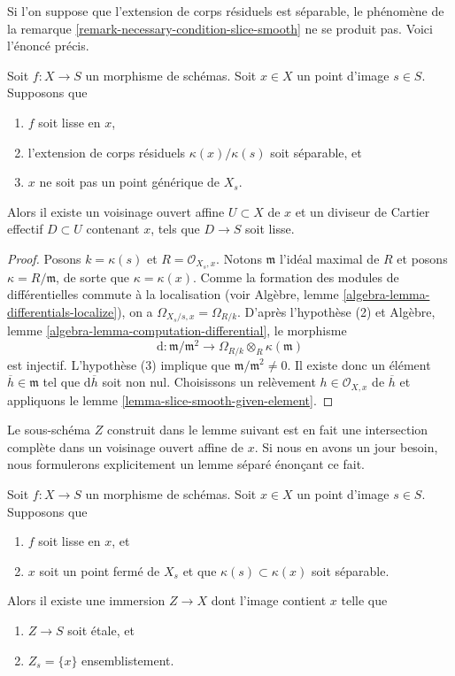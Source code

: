 \noindent
Si l'on suppose que l'extension de corps résiduels est séparable, le
phénomène de la
remarque \ref{remark-necessary-condition-slice-smooth}
ne se produit pas. Voici l'énoncé précis.

\begin{lemma}
\label{lemma-slice-smooth-once-separable-residue-field-extension}
Soit $f : X \to S$ un morphisme de schémas.
Soit $x \in X$ un point d'image $s \in S$.
Supposons que
\begin{enumerate}
\item $f$ soit lisse en $x$,
\item l'extension de corps résiduels $\kappa(x)/\kappa(s)$
soit séparable, et
\item $x$ ne soit pas un point générique de $X_s$.
\end{enumerate}
Alors il existe un voisinage ouvert affine $U \subset X$ de $x$
et un diviseur de Cartier effectif $D \subset U$ contenant $x$, tels que
$D \to S$ soit lisse.
\end{lemma}

\begin{proof}
Posons $k = \kappa(s)$ et $R = \mathcal{O}_{X_s, x}$.
Notons $\mathfrak m$ l'idéal maximal de $R$ et posons
$\kappa = R/\mathfrak m$, de sorte que $\kappa = \kappa(x)$.
Comme la formation des modules de différentielles commute à la localisation (voir
Algèbre, lemme \ref{algebra-lemma-differentials-localize}),
on a $\Omega_{X_s/s, x} = \Omega_{R/k}$. D'après l'hypothèse (2) et
Algèbre, lemme \ref{algebra-lemma-computation-differential},
le morphisme
$$
\text{d} :
\mathfrak m/\mathfrak m^2
\longrightarrow
\Omega_{R/k} \otimes_R \kappa(\mathfrak m)
$$
est injectif. L'hypothèse (3) implique que
$\mathfrak m/\mathfrak m^2 \not = 0$.
Il existe donc un élément $\overline{h} \in \mathfrak m$
tel que $\text{d}\overline{h}$ soit non nul. Choisissons un relèvement
$h \in \mathcal{O}_{X, x}$ de $\overline{h}$ et appliquons le
lemme \ref{lemma-slice-smooth-given-element}.
\end{proof}

\noindent
Le sous-schéma $Z$ construit dans le lemme suivant est en fait une intersection
complète dans un voisinage ouvert affine de $x$. Si nous en avons un jour besoin,
nous formulerons explicitement un lemme séparé énonçant ce fait.

\begin{lemma}
\label{lemma-slice-smooth}
Soit $f : X \to S$ un morphisme de schémas.
Soit $x \in X$ un point d'image $s \in S$.
Supposons que
\begin{enumerate}
\item $f$ soit lisse en $x$, et
\item $x$ soit un point fermé de $X_s$ et que $\kappa(s) \subset \kappa(x)$
soit séparable.
\end{enumerate}
Alors il existe une immersion $Z \to X$ dont l'image contient $x$ telle que
\begin{enumerate}
\item $Z \to S$ soit \'etale, et
\item $Z_s = \{x\}$ ensemblistement.
\end{enumerate}
\end{lemma}

